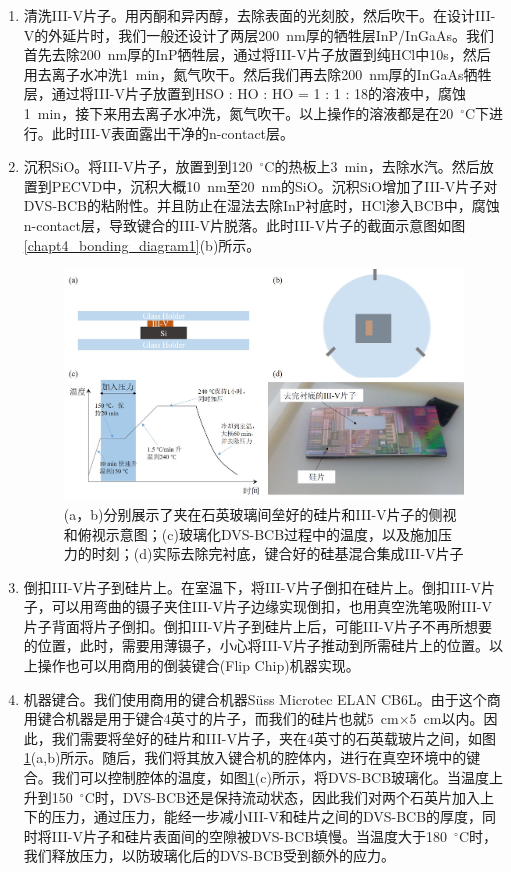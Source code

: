 \begin{enumerate}[(1)]
	\item 清洗III-V片子。用丙酮和异丙醇，去除表面的光刻胶，然后吹干。在设计III-V的外延片时，我们一般还设计了两层200~nm厚的牺牲层InP/InGaAs。我们首先去除200~nm厚的InP牺牲层，通过将III-V片子放置到纯HCl中10s，然后用去离子水冲洗1~min，氮气吹干。然后我们再去除200~nm厚的InGaAs牺牲层，通过将III-V片子放置到HSO : HO : HO = 1 : 1 : 18的溶液中，腐蚀1~min，接下来用去离子水冲洗，氮气吹干。以上操作的溶液都是在20~$^{\circ}$C下进行。此时III-V表面露出干净的n-contact层。
	\item 沉积SiO。将III-V片子，放置到到120~$^{\circ}$C的热板上3~min，去除水汽。然后放置到PECVD中，沉积大概10~nm至20~nm的SiO。沉积SiO增加了III-V片子对DVS-BCB的粘附性。并且防止在湿法去除InP衬底时，HCl渗入BCB中，腐蚀n-contact层，导致键合的III-V片脱落。此时III-V片子的截面示意图如图\ref{chapt4_bonding_diagram1}(b)所示。
	\begin{figure}[htb]
		\centering
		\includegraphics[width=14cm]{./Pictures/chapt4_bonding_diagram2.jpg}
		\caption{(a，b)分别展示了夹在石英玻璃间垒好的硅片和III-V片子的侧视和俯视示意图；(c)玻璃化DVS-BCB过程中的温度，以及施加压力的时刻；(d)实际去除完衬底，键合好的硅基混合集成III-V片子}
		\label{chapt4_bonding_diagram2}
	\end{figure}
	\item 倒扣III-V片子到硅片上。在室温下，将III-V片子倒扣在硅片上。倒扣III-V片子，可以用弯曲的镊子夹住III-V片子边缘实现倒扣，也用真空洗笔吸附III-V片子背面将片子倒扣。倒扣III-V片子到硅片上后，可能III-V片子不再所想要的位置，此时，需要用薄镊子，小心将III-V片子推动到所需硅片上的位置。以上操作也可以用商用的倒装键合(Flip Chip)机器实现。
	\item 机器键合。我们使用商用的键合机器S{\"u}ss Microtec ELAN CB6L。由于这个商用键合机器是用于键合4英寸的片子，而我们的硅片也就5~cm$\times$5~cm以内。因此，我们需要将垒好的硅片和III-V片子，夹在4英寸的石英载玻片之间，如图\ref{chapt4_bonding_diagram2}(a,b)所示。随后，我们将其放入键合机的腔体内，进行在真空环境中的键合。我们可以控制腔体的温度，如图\ref{chapt4_bonding_diagram2}(c)所示，将DVS-BCB玻璃化。当温度上升到150~$^{\circ}$C时，DVS-BCB还是保持流动状态，因此我们对两个石英片加入上下的压力，通过压力，能经一步减小III-V和硅片之间的DVS-BCB的厚度，同时将III-V片子和硅片表面间的空隙被DVS-BCB填慢。当温度大于180~$^{\circ}$C时，我们释放压力，以防玻璃化后的DVS-BCB受到额外的应力。

\end{enumerate}
